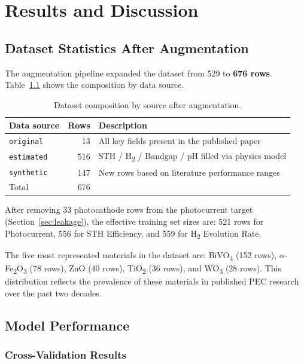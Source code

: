 \chapter{Results and Discussion}\label{ch:C}

\section{Dataset Statistics After Augmentation}

The augmentation pipeline expanded the dataset from 529 to \textbf{676 rows}.
Table~\ref{tab:augmented_summary} shows the composition by data source.

\begin{table}[htb]
\centering
\caption{Dataset composition by source after augmentation.}
\label{tab:augmented_summary}
\begin{tabular}{lrl}
\toprule
Data source & Rows & Description \\
\midrule
\texttt{original}  &  13 & All key fields present in the published paper \\
\texttt{estimated} & 516 & STH / H\textsubscript{2} / Bandgap / pH filled via physics model \\
\texttt{synthetic} & 147 & New rows based on literature performance ranges \\
\midrule
Total              & 676 & \\
\bottomrule
\end{tabular}
\end{table}

After removing 33 photocathode rows from the photocurrent target
(Section~\ref{sec:leakage}), the effective training set sizes are:
521 rows for Photocurrent, 556 for STH Efficiency, and 559 for
H\textsubscript{2} Evolution Rate.

The five most represented materials in the dataset are:
BiVO\textsubscript{4} (152 rows), $\alpha$-Fe\textsubscript{2}O\textsubscript{3}
(78 rows), ZnO (40 rows), TiO\textsubscript{2} (36 rows), and WO\textsubscript{3}
(28 rows).
This distribution reflects the prevalence of these materials in published
PEC research over the past two decades.

\section{Model Performance}

\subsection{Cross-Validation Results}

